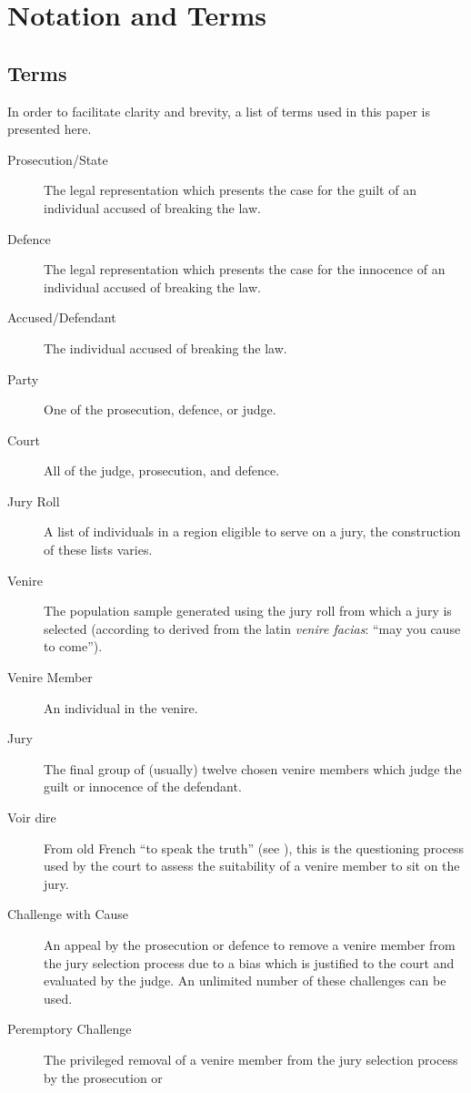 \section{Notation and Terms}
\label{c:Notation}

\subsection{Terms}

In order to facilitate clarity and brevity, a list of terms used in this paper is presented here.

\begin{description}
\item[Prosecution/State] The legal representation which presents the case for the guilt of an individual accused of breaking the law.
\item[Defence] The legal representation which presents the case for the innocence of an individual accused of breaking the law.
\item[Accused/Defendant] The individual accused of breaking the law.
\item[Party] One of the prosecution, defence, or judge.
\item[Court] All of the judge, prosecution, and defence.
\item[Jury Roll] A list of individuals in a region eligible to serve on a jury, the construction of these lists varies.
\item[Venire] The population sample generated using the jury roll from which a jury is selected (according to \cite{venireety}
  derived from the latin \textit{venire facias}: ``may you cause to come'').
\item[Venire Member] An individual in the venire.
\item[Jury] The final group of (usually) twelve chosen venire members which judge the guilt or innocence of the
    defendant.
\item[Voir dire] From old French ``to speak the truth'' (see \cite{voirety}), this is the questioning process used by the court to
  assess the suitability of a venire member to sit on the jury.
\item[Challenge with Cause] An appeal by the prosecution or defence to remove a venire member from the jury selection process due
  to a bias which is justified to the court and evaluated by the
  judge. An unlimited number of these challenges can be used.
\item[Peremptory Challenge] The privileged removal of a venire member from the jury selection process by the prosecution or

\end{description}
